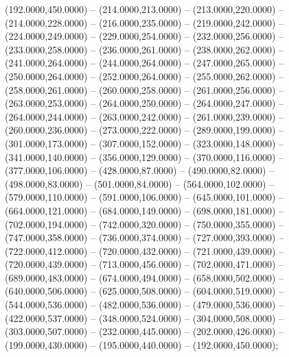 \begin{scope}[shift={(-191.875,-81.87406)}]
  \begin{scope}[draw=black,fill=black,line join=round,line width=0.208pt]
     (192.0000,450.0000) -- (214.0000,213.0000) --
      (213.0000,220.0000) -- (214.0000,228.0000) -- (216.0000,235.0000) --
      (219.0000,242.0000) -- (224.0000,249.0000) -- (229.0000,254.0000) --
      (232.0000,256.0000) -- (233.0000,258.0000) -- (236.0000,261.0000) --
      (238.0000,262.0000) -- (241.0000,264.0000) -- (244.0000,264.0000) --
      (247.0000,265.0000) -- (250.0000,264.0000) -- (252.0000,264.0000) --
      (255.0000,262.0000) -- (258.0000,261.0000) -- (260.0000,258.0000) --
      (261.0000,256.0000) -- (263.0000,253.0000) -- (264.0000,250.0000) --
      (264.0000,247.0000) -- (264.0000,244.0000) -- (263.0000,242.0000) --
      (261.0000,239.0000) -- (260.0000,236.0000) -- (273.0000,222.0000) --
      (289.0000,199.0000) -- (301.0000,173.0000) -- (307.0000,152.0000) --
      (323.0000,148.0000) -- (341.0000,140.0000) -- (356.0000,129.0000) --
      (370.0000,116.0000) -- (377.0000,106.0000) -- (428.0000,87.0000) --
      (490.0000,82.0000) -- (498.0000,83.0000) -- (501.0000,84.0000) --
      (564.0000,102.0000) -- (579.0000,110.0000) -- (591.0000,106.0000) --
      (645.0000,101.0000) -- (664.0000,121.0000) -- (684.0000,149.0000) --
      (698.0000,181.0000) -- (702.0000,194.0000) -- (742.0000,320.0000) --
      (750.0000,355.0000) -- (747.0000,358.0000) -- (736.0000,374.0000) --
      (727.0000,393.0000) -- (722.0000,412.0000) -- (720.0000,432.0000) --
      (721.0000,439.0000) -- (720.0000,439.0000) -- (713.0000,456.0000) --
      (702.0000,471.0000) -- (689.0000,483.0000) -- (674.0000,494.0000) --
      (658.0000,502.0000) -- (640.0000,506.0000) -- (625.0000,508.0000) --
      (604.0000,519.0000) -- (544.0000,536.0000) -- (482.0000,536.0000) --
      (479.0000,536.0000) -- (422.0000,537.0000) -- (348.0000,524.0000) --
      (304.0000,508.0000) -- (303.0000,507.0000) -- (232.0000,445.0000) --
      (202.0000,426.0000) -- (199.0000,430.0000) -- (195.0000,440.0000) --
      (192.0000,450.0000);
  \end{scope}
\end{scope}
